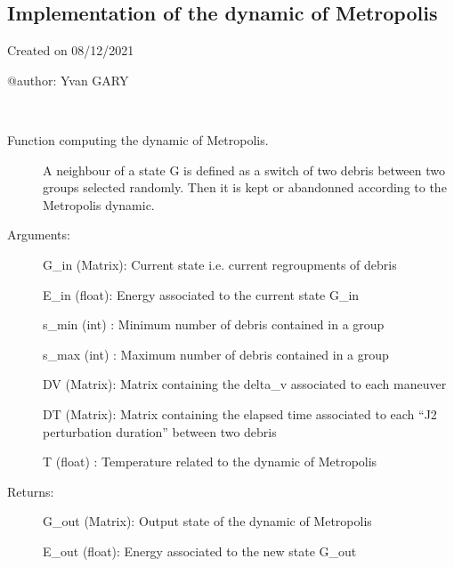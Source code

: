 \documentclass[letterpaper,10pt,english]{sphinxmanual}
\begin{document}
\subsection{Implementation of the dynamic of Metropolis}
\label{\detokenize{regroupement/optimizer:implementation-of-the-dynamic-of-metropolis}}\label{\detokenize{regroupement/optimizer:module-regroupement.optimizer.Metropolis}}
Created on 08/12/2021

@author: Yvan GARY

\begin{fulllineitems}
\label{\detokenize{regroupement/optimizer:regroupement.optimizer.Metropolis.Metropolis}}~\begin{description}
\item[{Function computing the dynamic of Metropolis. }] \leavevmode
A neighbour of a state G is defined as a switch of two debris between two groups selected randomly. 
Then it is kept or abandonned according to the Metropolis dynamic.

\item[{Arguments:}] \leavevmode
G\_in (Matrix): Current state  i.e. current regroupments of debris

E\_in (float): Energy associated to the current state G\_in

s\_min (int) : Minimum number of debris contained in a group

s\_max (int) : Maximum number of debris contained in a group

DV (Matrix): Matrix containing the delta\_v associated to each maneuver

DT (Matrix): Matrix containing the elapsed time associated to each “J2 perturbation duration” between two debris

T (float) : Temperature related to the dynamic of Metropolis

\item[{Returns:}] \leavevmode
G\_out (Matrix): Output state of the dynamic of Metropolis

E\_out (float): Energy associated to the new state G\_out

\end{description}

\end{fulllineitems}
\end{document}
